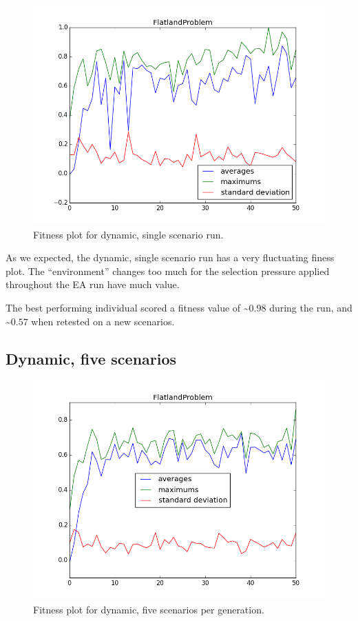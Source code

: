 \documentclass[twoside]{article}
\begin{document}
\begin{multicols}{2}
  \begin{figure}[H]
    \centering
    \includegraphics[width=\linewidth]{images/dynamic_1.png}
    \caption{Fitness plot for dynamic, single scenario run.} \label{fig:static-single}
  \end{figure}

  As we expected, the dynamic, single scenario run has a very fluctuating finess plot.
  The ``environment'' changes too much for the selection pressure applied throughout the EA run have much value.

  The best performing individual scored a fitness value of \textasciitilde $0.98$ during the run, and \textasciitilde $0.57$ when retested on a new scenarios.

  \subsection{Dynamic, five scenarios}
  
  \begin{figure}[H]
    \centering
    \includegraphics[width=\linewidth]{images/dynamic_5.png}
    \caption{Fitness plot for dynamic, five scenarios per generation.} \label{fig:static-single}
  \end{figure}


\end{multicols}
\end{document}
